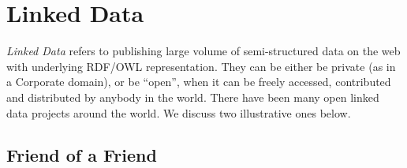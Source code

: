 \section{Linked Data}

{\em Linked Data} refers to publishing large volume of semi-structured data on the web with underlying RDF/OWL representation. 
They can be either be private (as in a Corporate domain), or be ``open'', when it can be freely accessed, contributed and 
distributed by anybody in the world. 
%
% 
There have been many open linked data projects around the world. We discuss two illustrative ones below.

\subsection{Friend of a Friend}

